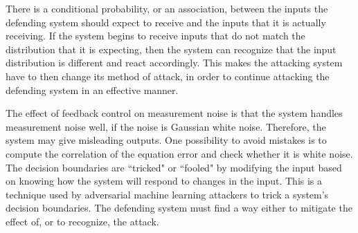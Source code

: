 \documentclass[conference]{IEEEtran}
\begin{document}
There is a conditional probability, or an association, between the inputs the defending system should expect to receive and the inputs that it is actually receiving. If the system begins to receive inputs that do not match the distribution that it is expecting, then the system can recognize that the input distribution is different and react accordingly. This makes the attacking system have to then change its method of attack, in order to continue attacking the defending system in an effective manner. 

The effect of feedback control on measurement noise is that the system handles measurement noise well, if the noise is Gaussian white noise. %
Therefore, the system may give misleading outputs. One possibility to avoid mistakes is to compute the correlation of the equation error and check whether it is white noise. The decision boundaries are ``tricked" or ``fooled" by modifying the input based on knowing how the system will respond to changes in the input. This is a technique used by adversarial machine learning attackers to trick a system's decision boundaries. The defending system must find a way either to mitigate the effect of, or to recognize, the attack. 
\end{document}
